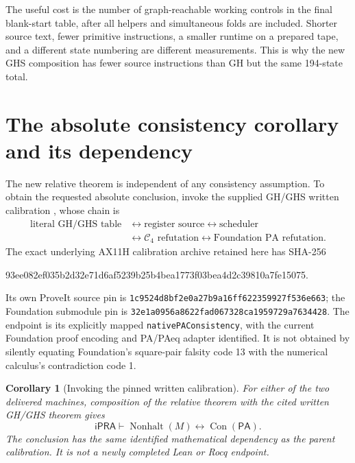 \documentclass[11pt,letterpaper]{article}
\newcommand{\ipra}{\ensuremath{\mathsf{iPRA}}}
\newcommand{\PA}{\mathsf{PA}}
\newcommand{\Con}{\operatorname{Con}}
\newcommand{\NH}{\operatorname{Nonhalt}}
\newtheorem{corollary}[theorem]{Corollary}
\begin{document}
The useful cost is the number of graph-reachable working controls in the final
blank-start table, after all helpers and simultaneous folds are included.
Shorter source text, fewer primitive instructions, a smaller runtime on a
prepared tape, and a different state numbering are different measurements.
This is why the new GHS composition has fewer source instructions than GH
but the same 194-state total.



\section{The absolute consistency corollary and its dependency}
\label{sec:absolute}

The new relative theorem is independent of any consistency assumption.
To obtain the requested absolute conclusion, invoke the supplied GH/GHS
written calibration \cite{gh,calibration}, whose chain is
\[
\begin{aligned}
 \text{literal GH/GHS table}
 &\longleftrightarrow \text{register source}
 \longleftrightarrow \text{scheduler}\\
 &\longleftrightarrow \mathcal C_4\text{ refutation}
 \longleftrightarrow \text{Foundation PA refutation}.
\end{aligned}
\]
The exact underlying AX11H calibration archive retained here has SHA-256
\begin{center}\small\ttfamily
93ee082ef035b2d32e71d6af5239b25b4bea1773f03bea4d2c39810a7fe15075.
\end{center}
Its own ProveIt source pin is
\texttt{1c9524d8bf2e0a27b9a16ff622359927f536e663}; the Foundation
submodule pin is
\texttt{32e1a0956a8622fad067328ca1959729a7634428}.
The endpoint is its explicitly mapped \texttt{nativePAConsistency}, with
the current Foundation proof encoding and PA/PAeq adapter identified.
It is not obtained by silently equating Foundation's square-pair falsity
code 13 with the numerical calculus's contradiction code 1.

\begin{corollary}[Invoking the pinned written calibration]
For either of the two delivered machines, composition of the relative theorem
with the cited written GH/GHS theorem gives
\[
 \ipra\vdash\NH(M)\longleftrightarrow\Con(\PA).
\]
The conclusion has the same identified mathematical dependency as the
parent calibration. It is not a newly completed Lean or Rocq endpoint.
\end{corollary}
\end{document}
